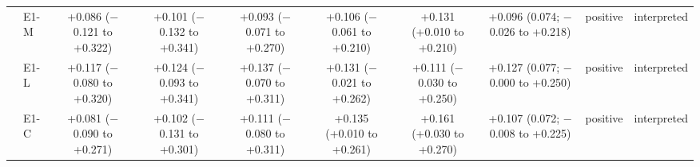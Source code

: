 \begin{longtable}{@{}p{3.0cm}lcccccclp{2.2cm}@{}}
 & E1-M & \makecell{+0.086\\{\scriptsize ($-$0.121 to +0.322)}} & \makecell{+0.101\\{\scriptsize ($-$0.132 to +0.341)}} & \makecell{+0.093\\{\scriptsize ($-$0.071 to +0.270)}} & \makecell{+0.106\\{\scriptsize ($-$0.061 to +0.210)}} & \makecell{+0.131\\{\scriptsize (+0.010 to +0.210)}} & \makecell{+0.096\\{\scriptsize (0.074; $-$0.026 to +0.218)}} & positive & interpreted \\
 & E1-L & \makecell{+0.117\\{\scriptsize ($-$0.080 to +0.320)}} & \makecell{+0.124\\{\scriptsize ($-$0.093 to +0.341)}} & \makecell{+0.137\\{\scriptsize ($-$0.070 to +0.311)}} & \makecell{+0.131\\{\scriptsize ($-$0.021 to +0.262)}} & \makecell{+0.111\\{\scriptsize ($-$0.030 to +0.250)}} & \makecell{+0.127\\{\scriptsize (0.077; $-$0.000 to +0.250)}} & positive & interpreted \\
 & E1-C & \makecell{+0.081\\{\scriptsize ($-$0.090 to +0.271)}} & \makecell{+0.102\\{\scriptsize ($-$0.131 to +0.301)}} & \makecell{+0.111\\{\scriptsize ($-$0.080 to +0.311)}} & \makecell{+0.135\\{\scriptsize (+0.010 to +0.261)}} & \makecell{+0.161\\{\scriptsize (+0.030 to +0.270)}} & \makecell{+0.107\\{\scriptsize (0.072; $-$0.008 to +0.225)}} & positive & interpreted \\
\end{longtable}
